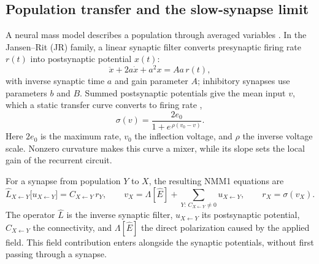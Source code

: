 \documentclass[11pt,a4paper]{article}
\newcommand{\Sig}{\sigma}
\begin{document}
\subsection{Population transfer and the slow-synapse limit}\label{sec:nmm}
A neural mass model describes a population through averaged variables
\cite{ruffini2025rosetta,jansen1995}. In the Jansen--Rit (JR) family, a linear synaptic
filter converts presynaptic firing rate $r(t)$ into postsynaptic potential $x(t)$:
\[
\ddot x+2a\dot x+a^2x=Aa\,r(t),
\]
with inverse synaptic time $a$ and gain parameter $A$; inhibitory synapses use
parameters $b$ and $B$. Summed postsynaptic potentials give the mean input $v$, which
a static transfer curve converts to firing rate \cite{wilsoncowan1972},
\begin{equation}
\Sig(v)=\frac{2e_0}{1+e^{\,\rho(v_0-v)}} .
\label{eq:sigmoid}
\end{equation}
Here $2e_0$ is the maximum rate, $v_0$ the inflection voltage, and $\rho$ the inverse
voltage scale. Nonzero curvature makes this curve a mixer, while its slope sets
the local gain of the recurrent circuit.

For a synapse from population $Y$ to $X$, the resulting NMM1 equations are
\cite{ruffini2025rosetta}
\begin{equation}
\hat L_{X\leftarrow Y}\big[u_{X\leftarrow Y}\big]=C_{X\leftarrow Y}\,r_Y,\qquad
v_X=\Lambda[\hat E]+\!\!\sum_{Y:\,C_{X\leftarrow Y}\neq0}\!\!u_{X\leftarrow Y},\qquad
r_X=\Sig(v_X).
\label{eq:nmm1}
\end{equation}
The operator $\hat L$ is the inverse synaptic filter, $u_{X\leftarrow Y}$ its
postsynaptic potential, $C_{X\leftarrow Y}$ the connectivity, and $\Lambda[\hat E]$
the direct polarization caused by the applied field. This field contribution enters
alongside the synaptic potentials, without first passing through a synapse.
\end{document}
